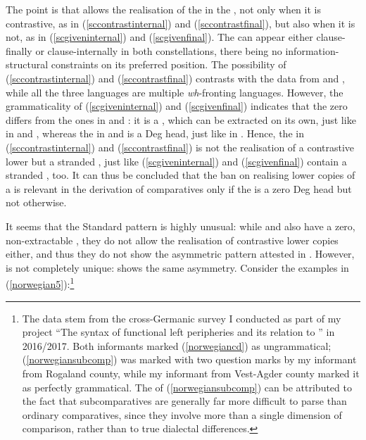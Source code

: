The point is that  allows the realisation of the  in the , not only when it is contrastive, as in (\ref{sccontrastinternal}) and (\ref{sccontrastfinal}), but also when it is not, as in (\ref{scgiveninternal}) and (\ref{scgivenfinal}). The  can appear either clause-finally or clause-internally in both constellations, there being no information-structural constraints on its preferred position. The possibility of (\ref{sccontrastinternal}) and (\ref{sccontrastfinal}) contrasts with the data from  and , while all the three languages are multiple \textit{wh}-fronting languages. However, the grammaticality of (\ref{scgiveninternal}) and (\ref{scgivenfinal}) indicates that the  zero  differs from the ones in  and : it is a  , which can be extracted on its own, just like in  and , whereas the  in  and  is a Deg head, just like in . Hence, the  in (\ref{sccontrastinternal}) and (\ref{sccontrastfinal}) is not the realisation of a contrastive lower  but a stranded , just like (\ref{scgiveninternal}) and (\ref{scgivenfinal}) contain a stranded , too. It can thus be concluded that the ban on realising lower copies of a  is relevant in the derivation of comparatives only if the  is a zero Deg head but not otherwise.

It seems that the Standard  pattern is highly unusual: while  and  also have a zero, non-extractable , they do not allow the realisation of contrastive lower copies either, and thus they do not show the asymmetric pattern attested in . However,  is not completely unique:  shows the same asymmetry. Consider the examples in (\ref{norwegian5}):\footnote{The  data stem from the cross-Germanic survey I conducted as part of my project ``The syntax of functional left peripheries and its relation to '' in 2016/2017. Both informants marked (\ref{norwegiancd}) as ungrammatical; (\ref{norwegiansubcomp}) was marked with two question marks by my informant from Rogaland county, while my informant from Vest-Agder county marked it as perfectly grammatical. The  of (\ref{norwegiansubcomp}) can be attributed to the fact that subcomparatives are generally far more difficult to parse than ordinary comparatives, since they involve more than a single dimension of comparison, rather than to true dialectal differences.}

